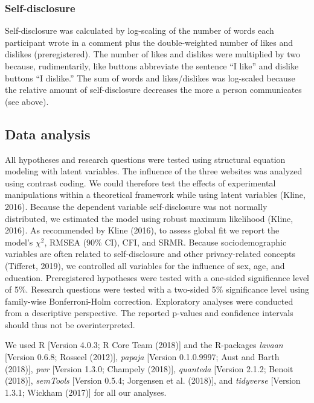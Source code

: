 \documentclass[
  english,
  man,floatsintext]{apa6}
\begin{document}
\hypertarget{self-disclosure}{%
\subsubsection{Self-disclosure}\label{self-disclosure}}

Self-disclosure was calculated by log-scaling of the number of words each participant wrote in a comment plus the double-weighted number of likes and dislikes (preregistered).
The number of likes and dislikes were multiplied by two because, rudimentarily, like buttons abbreviate the sentence ``I like'' and dislike buttons ``I dislike.''
The sum of words and likes/dislikes was log-scaled because the relative amount of self-disclosure decreases the more a person communicates (see above).

\hypertarget{data-analysis}{%
\subsection{Data analysis}\label{data-analysis}}

All hypotheses and research questions were tested using structural equation modeling with latent variables.
The influence of the three websites was analyzed using contrast coding.
We could therefore test the effects of experimental manipulations within a theoretical framework while using latent variables (Kline, 2016).
Because the dependent variable self-disclosure was not normally distributed, we estimated the model using robust maximum likelihood (Kline, 2016).
As recommended by Kline (2016), to assess global fit we report the model's \(\chi^2\), RMSEA (90\% CI), CFI, and SRMR.
Because sociodemographic variables are often related to self-disclosure and other privacy-related concepts (Tifferet, 2019), we controlled all variables for the influence of sex, age, and education.
Preregistered hypotheses were tested with a one-sided significance level of 5\%.
Research questions were tested with a two-sided 5\% significance level using family-wise Bonferroni-Holm correction.
Exploratory analyses were conducted from a descriptive perspective.
The reported p-values and confidence intervals should thus not be overinterpreted.

We used R {[}Version 4.0.3; R Core Team (2018){]} and the R-packages \emph{lavaan} {[}Version 0.6.8; Rosseel (2012){]}, \emph{papaja} {[}Version 0.1.0.9997; Aust and Barth (2018){]}, \emph{pwr} {[}Version 1.3.0; Champely (2018){]}, \emph{quanteda} {[}Version 2.1.2; Benoit (2018){]}, \emph{semTools} {[}Version 0.5.4; Jorgensen et al. (2018){]}, and \emph{tidyverse} {[}Version 1.3.1; Wickham (2017){]} for all our analyses.
\end{document}
